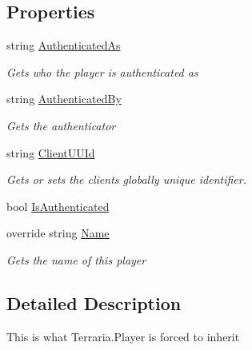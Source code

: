 \subsection*{Properties}
\begin{DoxyCompactItemize}
\item 
string \hyperlink{classOTA_1_1BasePlayer_a99abed4b5ac2cf92871687dc00bf7f66}{Authenticated\+As}
\begin{DoxyCompactList}\small\item\em Gets who the player is authenticated as \end{DoxyCompactList}\item 
string \hyperlink{classOTA_1_1BasePlayer_a285fa2c208fa2471fb593dfd2f95329c}{Authenticated\+By}
\begin{DoxyCompactList}\small\item\em Gets the authenticator \end{DoxyCompactList}\item 
string \hyperlink{classOTA_1_1BasePlayer_a816fb41b89b7df273d909df9e9a1c701}{Client\+U\+U\+Id}
\begin{DoxyCompactList}\small\item\em Gets or sets the clients globally unique identifier. \end{DoxyCompactList}\item 
bool \hyperlink{classOTA_1_1BasePlayer_a113748123407c45ee6c5faed4bd20edd}{Is\+Authenticated}
\item 
override string \hyperlink{classOTA_1_1BasePlayer_ab0ac1d6f4f094b0171294b8bd22c06ac}{Name}
\begin{DoxyCompactList}\small\item\em Gets the name of this player \end{DoxyCompactList}\end{DoxyCompactItemize}


\subsection{Detailed Description}
This is what Terraria.\+Player is forced to inherit 



